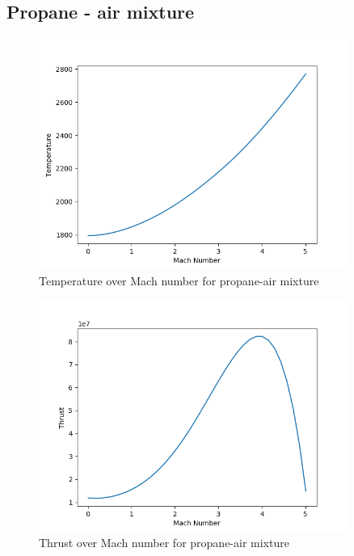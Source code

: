 \documentclass[a4paper,11pt]{article}
\begin{document}
\subsection{Propane - air mixture}
	\begin{figure}[H]
		\centering
       		\includegraphics[width=0.9\textwidth]{propan_pow(1mol)/Temperature_over_Mach.png}
       		\caption{Temperature over Mach number for propane-air mixture}
	\end{figure}
	\begin{figure}[H]
		\centering
		\includegraphics[width=0.9\textwidth]{propan_pow(1mol)/Thrust_over_Mach.png}
       		\caption{Thrust over Mach number for propane-air mixture}
	\end{figure}
\end{document}
